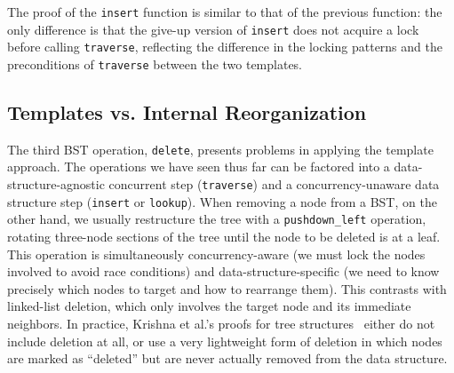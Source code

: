 \documentclass[a4paper,UKenglish,cleveref, autoref, thm-restate]{lipics-v2021}
\newcommand{\treerep}{\ensuremath{\mathsf{Node}}}
\newcommand{\nodeboxrep}{\ensuremath{\mathsf{Node\_ref}}}
\newcommand{\infp}{\ensuremath{\mathsf{InFP}}}
\begin{document}


The proof of the \lstinline{insert} function is similar to that of the previous function: the only difference is that the give-up version of \lstinline{insert} does not acquire a lock before calling \lstinline{traverse}, reflecting the difference in the locking patterns and the preconditions of \lstinline{traverse} between the two templates.

\subsection{Templates vs. Internal Reorganization}
\label{internal_reorganize}
The third BST operation, \lstinline{delete}, presents problems in applying the template approach. The operations we have seen thus far can be factored into a data-structure-agnostic concurrent step (\lstinline{traverse}) and a concurrency-unaware data structure step (\lstinline{insert} or \lstinline{lookup}). When removing a node from a BST, on the other hand, we usually restructure the tree with a \lstinline{pushdown_left} operation, %
rotating three-node sections of the tree until the node to be deleted is at a leaf. This operation is simultaneously concurrency-aware (we must lock the nodes involved to avoid race conditions) and data-structure-specific (we need to know precisely which nodes to target and how to rearrange them). This contrasts with linked-list deletion, which only involves the target node and its immediate neighbors. In practice, Krishna et al.'s proofs for tree structures~\cite{templates} either do not include deletion at all, or use a very lightweight form of deletion in which nodes are marked as ``deleted'' but are never actually removed from the data structure.
\end{document}
